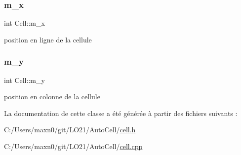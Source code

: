 \subsubsection{\texorpdfstring{m\+\_\+x}{m\_x}}
{\footnotesize\ttfamily int Cell\+::m\+\_\+x\hspace{0.3cm}{\ttfamily [private]}}



position en ligne de la cellule 

\mbox{\label{class_cell_a303c301e529e95ce1eadaf5b73ad41b2}} 
\subsubsection{\texorpdfstring{m\+\_\+y}{m\_y}}
{\footnotesize\ttfamily int Cell\+::m\+\_\+y\hspace{0.3cm}{\ttfamily [private]}}



position en colonne de la cellule 



La documentation de cette classe a été générée à partir des fichiers suivants \+:\begin{DoxyCompactItemize}
\item 
C\+:/\+Users/maxn0/git/\+L\+O21/\+Auto\+Cell/\mbox{\hyperlink{cell_8h}{cell.\+h}}\item 
C\+:/\+Users/maxn0/git/\+L\+O21/\+Auto\+Cell/\mbox{\hyperlink{cell_8cpp}{cell.\+cpp}}\end{DoxyCompactItemize}
